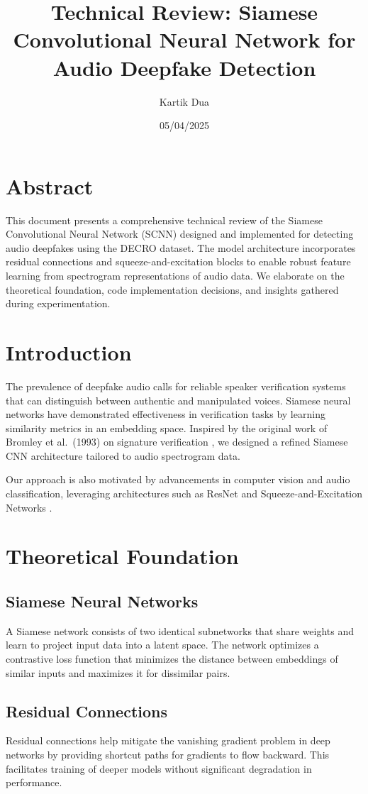 \documentclass[12pt]{article}
\title{Technical Review: Siamese Convolutional Neural Network for Audio Deepfake Detection}
\author{Kartik Dua}
\date{05/04/2025}
\begin{document}
\maketitle

\section*{Abstract}
This document presents a comprehensive technical review of the Siamese Convolutional Neural Network (SCNN) designed and implemented for detecting audio deepfakes using the DECRO dataset. The model architecture incorporates residual connections and squeeze-and-excitation blocks to enable robust feature learning from spectrogram representations of audio data. We elaborate on the theoretical foundation, code implementation decisions, and insights gathered during experimentation.

\section{Introduction}
The prevalence of deepfake audio calls for reliable speaker verification systems that can distinguish between authentic and manipulated voices. Siamese neural networks have demonstrated effectiveness in verification tasks by learning similarity metrics in an embedding space. Inspired by the original work of Bromley et al.\ (1993) on signature verification \cite{bromley1993signature}, we designed a refined Siamese CNN architecture tailored to audio spectrogram data.

Our approach is also motivated by advancements in computer vision and audio classification, leveraging architectures such as ResNet \cite{he2016deep} and Squeeze-and-Excitation Networks \cite{hu2018squeeze}.

\section{Theoretical Foundation}
\subsection{Siamese Neural Networks}
A Siamese network consists of two identical subnetworks that share weights and learn to project input data into a latent space. The network optimizes a contrastive loss function that minimizes the distance between embeddings of similar inputs and maximizes it for dissimilar pairs.

\subsection{Residual Connections}
Residual connections help mitigate the vanishing gradient problem in deep networks by providing shortcut paths for gradients to flow backward. This facilitates training of deeper models without significant degradation in performance.
\end{document}
